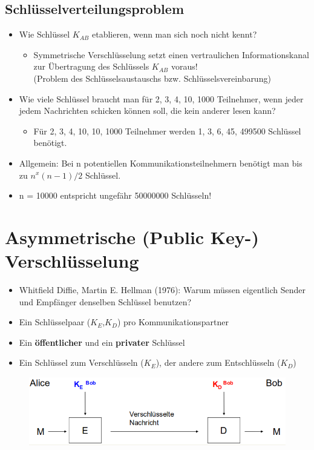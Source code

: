 \documentclass[openany]{book}
\begin{document}
\subsection{Schlüsselverteilungsproblem}

\begin{itemize}
    \item Wie Schlüssel $K_{AB}$ etablieren, wenn man sich noch nicht kennt?
    \begin{itemize}
        \item Symmetrische Verschlüsselung setzt einen vertraulichen Informationskanal zur Übertragung des Schlüssels $K_{AB}$ voraus! \\ (Problem des Schlüsselsaustauschs bzw. Schlüsselsvereinbarung)
    \end{itemize}
    \item Wie viele Schlüssel braucht man für 2, 3, 4, 10, 1000 Teilnehmer, wenn jeder jedem Nachrichten schicken können soll, die kein anderer lesen kann?
    \begin{itemize}
        \item Für 2, 3, 4, 10, 10, 1000 Teilnehmer werden 1, 3, 6, 45, 499500 Schlüssel benötigt.
    \end{itemize} 
    \item Allgemein: Bei n potentiellen Kommunikationsteilnehmern benötigt man bis zu $n^x(n-1)/2$ Schlüssel.
    \item n = 10000 entspricht ungefähr 50000000 Schlüsseln!
\end{itemize}

\section{Asymmetrische (Public Key-) Verschlüsselung}

\begin{itemize}
    \item Whitfield Diffie, Martin E. Hellman (1976): Warum müssen eigentlich Sender und Empfänger denselben Schlüssel benutzen?
    \item Ein Schlüsselpaar ($K_E$,$K_D$) pro Kommunikationspartner
    \item Ein \textbf{öffentlicher} und ein \textbf{privater} Schlüssel
    \item Ein Schlüssel zum Verschlüsseln ($K_E$), der andere zum Entschlüsseln ($K_D$)
\end{itemize}

\newpage

\begin{figure}[h!]
    \centering
    \includegraphics[width=\linewidth]{Pics/SymmetricEncryption2.PNG}
\end{figure} 
\end{document}

